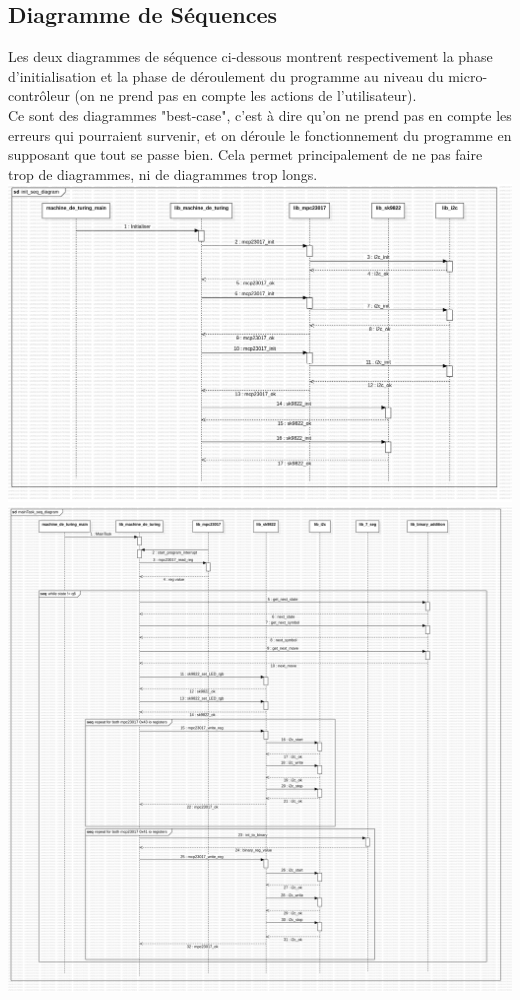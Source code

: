 \documentclass[12pt]{report}
\begin{document}
	\subsection{Diagramme de Séquences}
	Les deux diagrammes de séquence ci-dessous montrent respectivement la phase d'initialisation et la phase de déroulement du programme au niveau du micro-contrôleur (on ne prend pas en compte les actions de l'utilisateur).\\
	Ce sont des diagrammes "best-case", c'est à dire qu'on ne prend pas en compte les erreurs qui pourraient survenir, et on déroule le fonctionnement du programme en supposant que tout se passe bien. Cela permet principalement de ne pas faire trop de diagrammes, ni de diagrammes trop longs.\\
	\includegraphics[width=\textwidth]{img/initSeq}
	\includegraphics[width=\textwidth]{img/mainTaskSeq}
\end{document}
